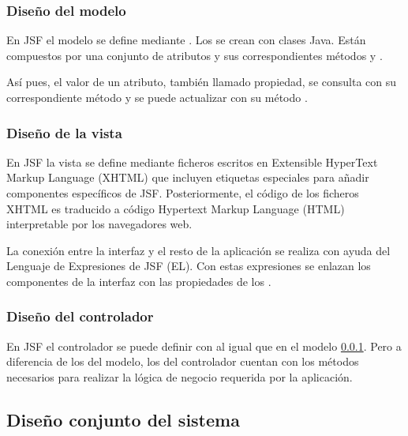 
\subsubsection{Diseño del modelo} \label{sec:arch-modelo}
En JSF el modelo se define mediante . Los
 se crean con clases Java. Están compuestos por una
conjunto de atributos y sus correspondientes métodos 
 y .

Así pues, el valor de un atributo, también llamado propiedad, se consulta con
su correspondiente método  y se puede actualizar con su
método .

\subsubsection{Diseño de la vista} \label{sec:arch-vista}
En JSF la vista se define mediante ficheros escritos en Extensible HyperText
Markup Language (XHTML) que incluyen etiquetas especiales para añadir
componentes específicos de JSF. Posteriormente, el código de los ficheros XHTML
es traducido a código Hypertext Markup Language (HTML) interpretable por los
navegadores web.

La conexión entre la interfaz y el resto de la aplicación se realiza con ayuda
del Lenguaje de Expresiones de JSF (EL). Con estas expresiones se enlazan los
componentes de la interfaz con las propiedades de los .

\subsubsection{Diseño del controlador} \label{sec:arch-ctl}
En JSF el controlador se puede definir con  al igual
que en el modelo \ref{sec:arch-modelo}. Pero a diferencia de los
 del modelo, los  del controlador
cuentan con los métodos necesarios para realizar la lógica de negocio
requerida por la aplicación.


\subsection{Diseño conjunto del sistema} \label{sec:design-comp}



